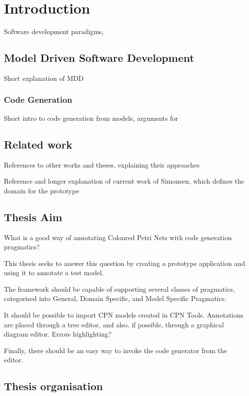\chapter{Introduction}
\label{chap:introduction}

Software development paradigms, 

\section{Model Driven Software Development}

Short explanation of MDD

\subsection{Code Generation}

Short intro to code generation from models, arguments for 

\section{Related work}

References to other works and theses, explaining their approaches

Reference and longer explanation of current work of Simonsen, which defines the
domain for the prototype

\section{Thesis Aim}

What is a good way of annotating Coloured Petri Nets with code generation
pragmatics?

This thesis seeks to answer this question by creating a prototype application
and using it to annotate a test model.

The framework should be capable of supporting several classes of pragmatics, 
categorised into General, Domain Specific, and Model Specific Pragmatics.

It should be possible to import CPN models created in CPN Tools. Annotations are
placed through a tree editor, and also, if possible, through a graphical diagram
editor. Errors highlighting?

Finally, there should be an easy way to invoke the code generator from the
editor.

\section{Thesis organisation}

